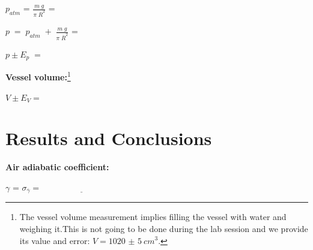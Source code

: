 \documentclass{article}
\begin{document}
\vspace{5mm}

$p_{atm}$ = \underline{\hspace{4cm}} \hspace{1cm} $\frac{m
\; g}{\pi \; \overline{R}^2}$ = \underline{\hspace{4cm}}

\vspace{5mm}

$p \; = \; p_{atm} \; + \; \frac{m \; g}{\pi \;
\overline{R}^2}$ = \underline{\hspace{4cm}}

\vspace{5mm}

$p\pm E_p \; = $ \underline{\hspace{4cm}}

\vspace{5mm}


\textbf{Vessel volume:}\footnote{The vessel volume measurement implies filling the vessel with water and weighing it.This is not going to be done during the lab session and we provide its value and error: $V =  \SI[separate-uncertainty]{1020(5)}{ cm^{3}}$.}
\vspace{5mm}

$V \pm E_V = $ \underline{\hspace{3cm}}
%


\section{Results and Conclusions}

\vspace{10mm}

\textbf{Air adiabatic coefficient:}

\vspace{5mm}
{\LARGE
$\gamma$ = \underline{\hspace{4cm}}
\hspace{1cm}
$\sigma_{\overline{\gamma}}=\underline{\hspace{4cm}}$
}

\nocite{Smith:2012qr,Stull2015}






\end{document}
